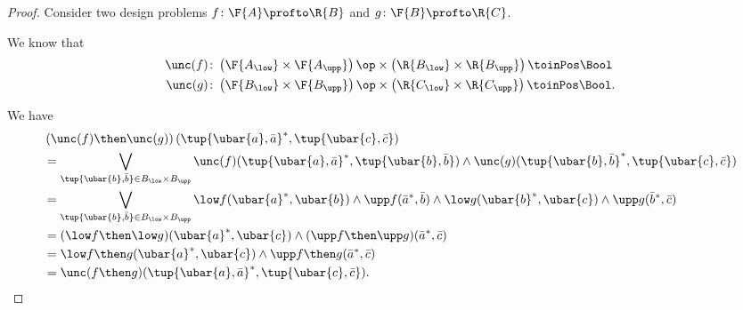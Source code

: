\begin{proof}
    Consider two design problems $f\colon \F{A}\profto \R{B}$ and $g\colon \F{B}\profto \R{C}$.

    We know that
    \begin{equation}
        \begin{aligned}
            \unc(f)&\colon \left( \F{A_{\low}}\times \F{A_{\upp}}\right)\op \times \left( \R{B_{\low}}\times \R{B_{\upp}}\right)\toinPos \Bool\\
            \unc(g)&\colon \left( \F{B_{\low}}\times \F{B_{\upp}}\right)\op \times \left( \R{C_{\low}}\times \R{C_{\upp}}\right)\toinPos \Bool.
        \end{aligned}
    \end{equation}

    We have
    \begin{equation}
        \begin{aligned}
            &\left(\unc(f)\then \unc(g)\right) (\tup{\ubar{a},\bar{a}}^*,\tup{\ubar{c},\bar{c}})\\
            &=\bigvee_{\tup{\ubar{b},\bar{b}}\in B_{\low}\times B_{\upp}} \unc(f)(\tup{\ubar{a},\bar{a}}^*,\tup{\ubar{b},\bar{b}})\wedge \unc(g)(\tup{\ubar{b},\bar{b}}^*,\tup{\ubar{c},\bar{c}})\\
            &= \bigvee_{\tup{\ubar{b},\bar{b}}\in B_{\low}\times B_{\upp}} \low f(\ubar{a}^*,\ubar{b})\wedge \upp f(\bar{a}^*,\bar{b})\wedge \low g(\ubar{b}^*,\ubar{c})\wedge \upp g(\bar{b}^*,\bar{c})\\
            &=(\low f\then \low g)(\ubar{a}^*,\ubar{c})\wedge (\upp f\then \upp g)(\bar{a}^*,\bar{c})\\
            &=\low f\then g (\ubar{a}^*,\ubar{c})\wedge \upp f\then g(\bar{a}^*,\bar{c})\\
            &=\unc(f\then g)(\tup{\ubar{a},\bar{a}}^*,\tup{\ubar{c},\bar{c}}).
        \end{aligned}
    \end{equation}
\end{proof}


